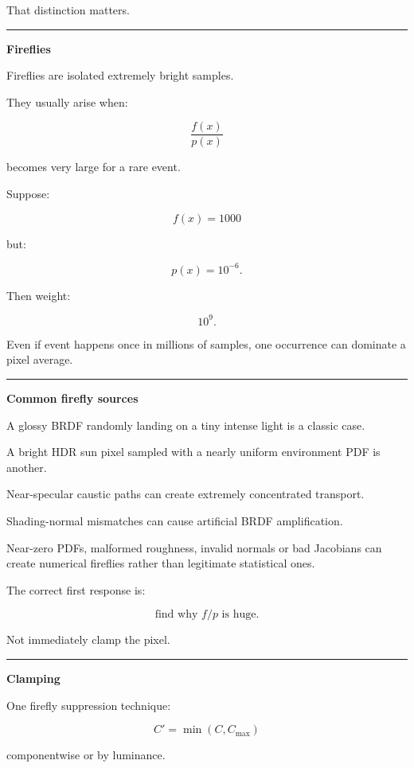 That distinction matters.

\begin{center}\rule{0.5\linewidth}{0.5pt}\end{center}

\textbf{Fireflies}

Fireflies are isolated extremely bright samples.

They usually arise when:

\[
\boxed{
\frac{f(x)}{p(x)}
}
\]

becomes very large for a rare event.

Suppose:

\[
f(x)=1000
\]

but:

\[
p(x)=10^{-6}.
\]

Then weight:

\[
10^9.
\]

Even if event happens once in millions of samples, one occurrence can dominate a pixel average.

\begin{center}\rule{0.5\linewidth}{0.5pt}\end{center}

\textbf{Common firefly sources}

A glossy BRDF randomly landing on a tiny intense light is a classic case.

A bright HDR sun pixel sampled with a nearly uniform environment PDF is another.

Near-specular caustic paths can create extremely concentrated transport.

Shading-normal mismatches can cause artificial BRDF amplification.

Near-zero PDFs, malformed roughness, invalid normals or bad Jacobians can create numerical fireflies rather than legitimate statistical ones.

The correct first response is:

\[
\boxed{
\text{find why }f/p\text{ is huge}.
}
\]

Not immediately clamp the pixel.

\begin{center}\rule{0.5\linewidth}{0.5pt}\end{center}

\textbf{Clamping}

One firefly suppression technique:

\[
C'=
\min(C,C_{\max})
\]

componentwise or by luminance.

